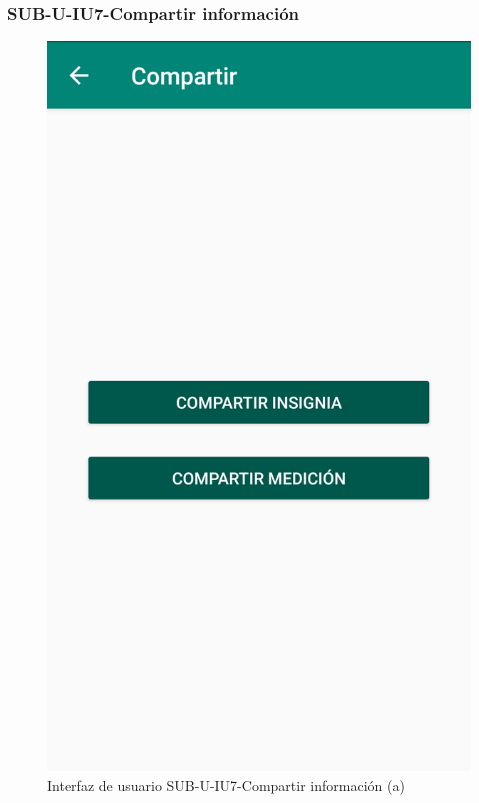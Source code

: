 \subsubsection{SUB-U-IU7-Compartir información}\label{SUB-U-IU7}
\begin{figure}[H]
	\centering
	\includegraphics[scale=.28]{Capitulo4/software/submodulos/usuarios/images/sub-u-iu7_a}
	\caption{Interfaz de usuario SUB-U-IU7-Compartir información (a)}
	\label{fig:sub-u-iu7.a}
\end{figure}
